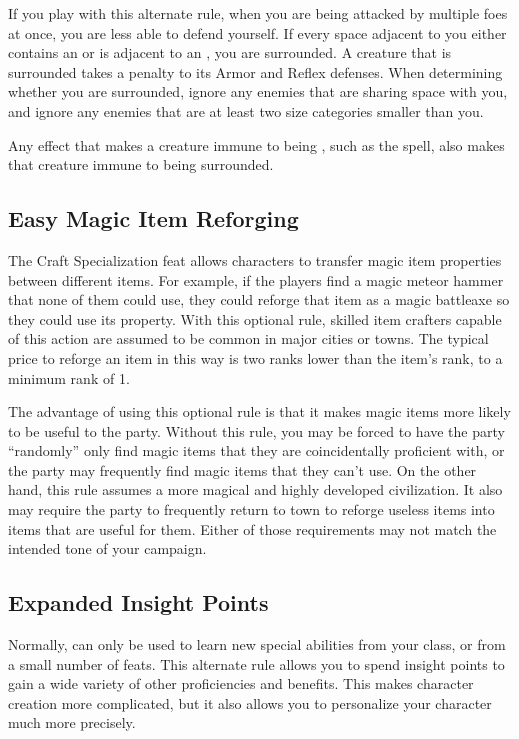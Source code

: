         If you play with this alternate rule, when you are being attacked by multiple foes at once, you are less able to defend yourself.
        If every space adjacent to you either contains an  or is adjacent to an , you are surrounded.
        A creature that is surrounded takes a  penalty to its Armor and Reflex defenses.
        When determining whether you are surrounded, ignore any enemies that are sharing space with you, and ignore any enemies that are at least two size categories smaller than you.

        Any effect that makes a creature immune to being \partiallyunaware, such as the  spell, also makes that creature immune to being surrounded.

    \subsection{Easy Magic Item Reforging}
        The Craft Specialization feat allows characters to transfer magic item properties between different items.
        For example, if the players find a magic meteor hammer that none of them could use, they could reforge that item as a magic battleaxe so they could use its property.
        With this optional rule, skilled item crafters capable of this action are assumed to be common in major cities or towns.
        The typical price to reforge an item in this way is two ranks lower than the item's rank, to a minimum rank of 1.

        The advantage of using this optional rule is that it makes magic items more likely to be useful to the party.
        Without this rule, you may be forced to have the party ``randomly'' only find magic items that they are coincidentally proficient with, or the party may frequently find magic items that they can't use.
        On the other hand, this rule assumes a more magical and highly developed civilization.
        It also may require the party to frequently return to town to reforge useless items into items that are useful for them.
        Either of those requirements may not match the intended tone of your campaign.

    \subsection{Expanded Insight Points}
        Normally,  can only be used to learn new special abilities from your class, or from a small number of feats.
        This alternate rule allows you to spend insight points to gain a wide variety of other proficiencies and benefits.
        This makes character creation more complicated, but it also allows you to personalize your character much more precisely.

